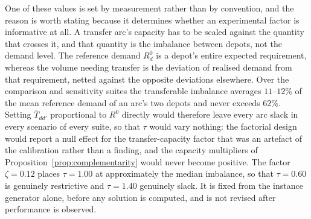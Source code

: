 \documentclass[authoryear,final,3p,times]{elsarticle}
\theoremstyle{definition}
\theoremstyle{plain}
\begin{document}
One of these values is set by measurement rather than by convention, and the
reason is worth stating because it determines whether an experimental factor is
informative at all.  A transfer arc's capacity has to be scaled against the
quantity that crosses it, and that quantity is the imbalance between depots,
not the demand level.  The reference demand $R^0_d$ is a depot's entire
expected requirement, whereas the volume needing transfer is the deviation of
realised demand from that requirement, netted against the opposite deviations
elsewhere.  Over the comparison and sensitivity suites the transferable
imbalance averages $11$--$12\%$ of the mean reference demand of an arc's two
depots and never exceeds $62\%$.  Setting $\overline T_{dd'}$ proportional to
$R^0$ directly would therefore leave every arc slack in every scenario of every
suite, so that $\tau$ would vary nothing: the factorial design would report a
null effect for the transfer-capacity factor that was an artefact of the
calibration rather than a finding, and the capacity multipliers of
Proposition~\ref{prop:complementarity} would never become positive.  The factor
$\zeta=0.12$ places $\tau=1.00$ at approximately the median imbalance, so that
$\tau=0.60$ is genuinely restrictive and $\tau=1.40$ genuinely slack.  It is
fixed from the instance generator alone, before any solution is computed, and
is not revised after performance is observed.
\end{document}
